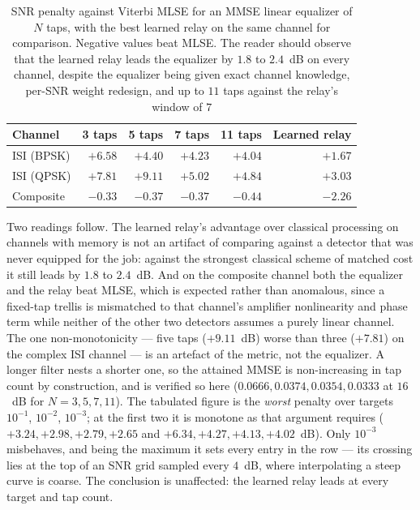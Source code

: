 \begin{table}[htbp]
\centering
\caption[MMSE linear equalization against MLSE]{SNR penalty against Viterbi MLSE for an MMSE linear equalizer of $N$ taps, with the best learned relay on the same channel for comparison. Negative values beat MLSE. The reader should observe that the learned relay leads the equalizer by $1.8$ to $2.4$~dB on every channel, despite the equalizer being given exact channel knowledge, per-SNR weight redesign, and up to $11$ taps against the relay's window of $7$}\label{tbl:mmse-baseline}
\begin{tabular}{lrrrrr}
\toprule
Channel & 3 taps & 5 taps & 7 taps & 11 taps & Learned relay \\
\midrule
ISI (BPSK)      & $+6.58$ & $+4.40$ & $+4.23$ & $+4.04$ & $\mathbf{+1.67}$ \\
ISI (QPSK)      & $+7.81$ & $+9.11$ & $+5.02$ & $+4.84$ & $\mathbf{+3.03}$ \\
Composite       & $-0.33$ & $-0.37$ & $-0.37$ & $-0.44$ & $\mathbf{-2.26}$ \\
\bottomrule
\end{tabular}
\end{table}

Two readings follow. The learned relay's advantage over classical processing on channels with memory is not an artifact of comparing against a detector that was never equipped for the job: against the strongest classical scheme of matched cost it still leads by $1.8$ to $2.4$~dB. And on the composite channel both the equalizer and the relay beat MLSE, which is expected rather than anomalous, since a fixed-tap trellis is mismatched to that channel's amplifier nonlinearity and phase term while neither of the other two detectors assumes a purely linear channel. The one non-monotonicity --- five taps ($+9.11$~dB) worse than three ($+7.81$) on the complex ISI channel --- is an artefact of the metric, not the equalizer. A longer filter nests a shorter one, so the attained MMSE is non-increasing in tap count by construction, and is verified so here ($0.0666, 0.0374, 0.0354, 0.0333$ at $16$~dB for $N=3,5,7,11$). The tabulated figure is the \emph{worst} penalty over targets $10^{-1}$, $10^{-2}$, $10^{-3}$; at the first two it is monotone as that argument requires ($+3.24, +2.98, +2.79, +2.65$ and $+6.34, +4.27, +4.13, +4.02$~dB). Only $10^{-3}$ misbehaves, and being the maximum it sets every entry in the row --- its crossing lies at the top of an SNR grid sampled every $4$~dB, where interpolating a steep curve is coarse. The conclusion is unaffected: the learned relay leads at every target and tap count.

